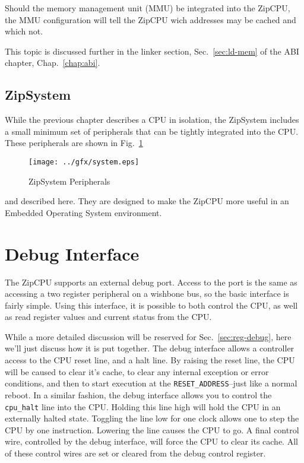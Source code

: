 \documentclass{gqtekspec}
\begin{document}
Should the memory management unit (MMU) be integrated into the ZipCPU, the MMU
configuration will tell the ZipCPU wich addresses may be cached and which not.

This topic is discussed further in the linker section, Sec.~\ref{sec:ld-mem}
of the ABI chapter, Chap.~\ref{chap:abi}.


\subsection{ZipSystem}\label{sec:zipsys}

While the previous chapter describes a CPU in isolation, the ZipSystem
includes a small minimum set of peripherals that can be tightly integrated into
the CPU.  These peripherals are shown in Fig.~\ref{fig:zipsystem}
\begin{figure}\begin{center}
\texttt{[image: ../gfx/system.eps]}
\caption{ZipSystem Peripherals}\label{fig:zipsystem}
\end{center}\end{figure}
and described here.  They are designed to make
the ZipCPU more useful in an Embedded Operating System environment.

\section{Debug Interface}\label{sec:debug}

The ZipCPU supports an external debug port.  Access to the port is the
same as accessing a two register peripheral on a wishbone bus, so the basic
interface is fairly simple.  Using this interface, it is possible to both
control the CPU, as well as read register values and current status from the
CPU.

While a more detailed discussion will be reserved for Sec.~\ref{sec:reg-debug},
here we'll just discuss how it is put together.  The debug interface allows
a controller access to the CPU reset line, and a halt line.  By raising the
reset line, the CPU will be caused to clear it's cache, to clear any internal
exception or error conditions, and then to start execution at the
{\tt RESET\_ADDRESS}--just like a normal reboot.  In a similar fashion, the
debug interface allows you to control the {\tt cpu\_halt} line into the
CPU.  Holding this line high will hold the CPU in an externally halted state.
Toggling the line low for one clock allows one to step the CPU by one 
instruction.  Lowering the line causes the CPU to go.  A final control wire, 
controlled by the debug interface, will force the CPU to clear its cache.
All of these control wires are set or cleared from the debug control register.
\end{document}
